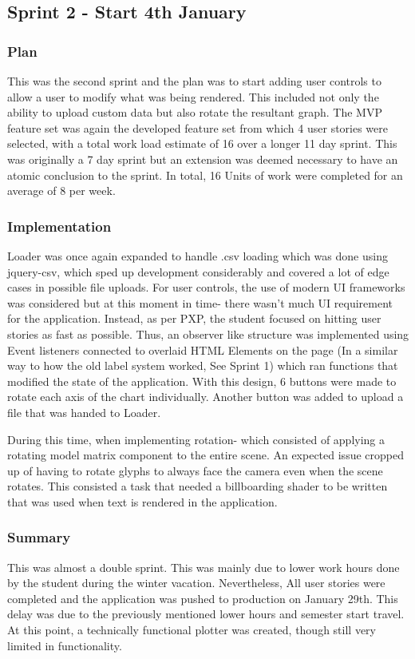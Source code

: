 \subsection{Sprint 2 - Start 4th January}
\subsubsection{Plan}
This was the second sprint and the plan was to start adding user controls to allow a user to modify what was being rendered. This included not only the ability to upload custom data but also rotate the resultant graph. The MVP feature set was again the developed feature set from which 4 user stories were selected, with a total work load estimate of 16 over a longer 11 day sprint. This was originally a 7 day sprint but an extension was deemed necessary to have an atomic conclusion to the sprint. In total, 16 Units of work were completed for an average of 8 per week.

\subsubsection{Implementation}
Loader was once again expanded to handle .csv loading which was done using jquery-csv, which sped up development considerably and covered a lot of edge cases in possible file uploads. For user controls, the use of modern UI frameworks was considered but at this moment in time- there wasn't much UI requirement for the application. Instead, as per PXP, the student focused on hitting user stories as fast as possible. Thus, an observer like structure was implemented using Event listeners connected to overlaid HTML Elements on the page (In a similar way to how the old label system worked, See Sprint 1) which ran functions that modified the state of the application. With this design, 6 buttons were made to rotate each axis of the chart individually. Another button was added to upload a file that was handed to Loader.

During this time, when implementing rotation- which consisted of applying a rotating model matrix component to the entire scene. An expected issue cropped up of having to rotate glyphs to always face the camera even when the scene rotates. This consisted a task that needed a billboarding shader to be written that was used when text is rendered in the application.

\subsubsection{Summary}
This was almost a double sprint. This was mainly due to lower work hours done by the student during the winter vacation. Nevertheless, All user stories were completed and the application was pushed to production on January 29th. This delay was due to the previously mentioned lower hours and semester start travel. At this point, a technically functional plotter was created, though still very limited in functionality.

